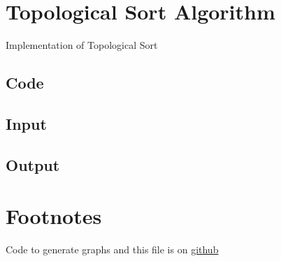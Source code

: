 \documentclass{article}
\begin{document}
    \section{Topological Sort Algorithm}
    Implementation of Topological Sort
    \subsection{Code}
    

    \subsection{Input}
    

    \subsection{Output}
    

    \section{Footnotes}
    Code to generate graphs and this file is on \href{https://github.com/pranavgade20/algos_complexity_benchmarker}{github}
\end{document}
